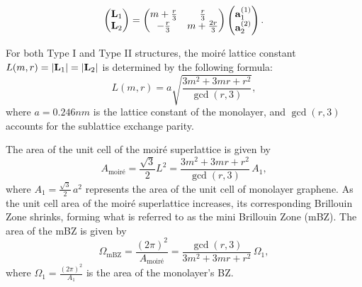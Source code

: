 \begin{itemize}
\begin{equation} \label{eq:type-II-L1L2}
\begin{pmatrix}
\vb{L}_1 \\ \vb{L}_2
\end{pmatrix} =
\begin{pmatrix}
m+\frac{r}{3} & \frac{r}{3} \\
-\frac{r}{3} & m+\frac{2r}{3}
\end{pmatrix}
\begin{pmatrix}
{\vb{a}}_1^{(1)} \\ {\vb{a}}_2^{(2)}
\end{pmatrix}.
\end{equation}

\end{itemize}

For both Type I and Type II structures, the moiré lattice constant \( L(m, r) = \abs{\vb{L}_1} = \abs{\vb{L}_2} \) is determined by the following formula:
\begin{equation} \label{eq:commensurate-constant}
L(m, r) = a \sqrt{\frac{3m^2 + 3mr + r^2}{\gcd(r, 3)}},
\end{equation}
where \(a = 0.246 \unit{nm}\) is the lattice constant of the monolayer, and \(\gcd(r, 3)\) accounts for the sublattice exchange parity.

The area of the unit cell of the moiré superlattice is given by
\begin{equation} \label{eq:superlattice_area_unitcell}
A_{\text{moiré}} = \frac{\sqrt{3}}{2} L^2 = \frac{3m^2 + 3mr + r^2}{\gcd(r,3)} \, A_1,
\end{equation}
where \( A_1 = \frac{\sqrt{3}}{2} \, a^2 \) represents the area of the unit cell of monolayer graphene. As the unit cell area of the moiré superlattice increases, its corresponding Brillouin Zone shrinks, forming what is referred to as the mini Brillouin Zone (mBZ). The area of the mBZ is given by
\begin{equation} \label{eq:bz-volume}
\Omega_{\text{mBZ}} = \frac{(2\pi)^2}{A_{\text{moiré}}} = \frac{\gcd(r,3)}{3m^2 + 3mr + r^2} \, \Omega_1,
\end{equation}
where \( \Omega_1 = \frac{(2\pi)^2}{A_1} \) is the area of the monolayer's BZ.


